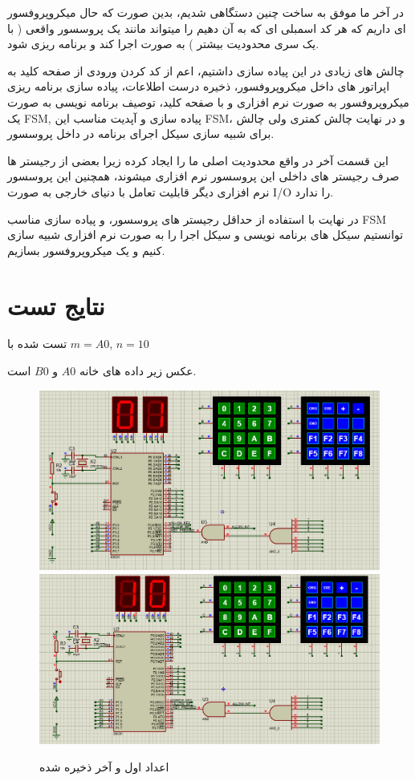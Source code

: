 \documentclass[11pt]{article}
\begin{document}
\begin{conclusion}
	در آخر ما موفق به ساخت چنین دستگاهی شدیم، بدین صورت که حال میکروپروفسور ای
	داریم که هر کد اسمبلی ای که به آن دهیم را میتواند مانند یک پروسسور واقعی ( با یک سری محدودیت بیشتر )
	به صورت  اجرا کند و برنامه ریزی شود.

	چالش های زیادی در این پیاده سازی داشتیم، اعم از
	کد کردن ورودی از صفحه کلید به اپراتور های داخل میکروپروفسور،
	ذخیره درست اطلاعات، پیاده سازی برنامه ریزی میکروپروفسور به صورت نرم افزاری و با صفحه کلید، توصیف
	برنامه نویسی به صورت یک FSM, پیاده سازی و آپدیت مناسب این FSM،
	و در نهایت چالش کمتری ولی چالش برای شبیه سازی سیکل اجرای برنامه در داخل پروسسور.

	این قسمت آخر در واقع محدودیت اصلی ما را ایجاد کرده زیرا بعضی از رجیستر ها
	صرف رجیستر های داخلی این پروسسور نرم افزاری میشوند، همچنین این پروسسور نرم افزاری
	دیگر قابلیت تعامل با دنیای خارجی به صورت I/O را ندارد.

	در نهایت با استفاده از حداقل رجیستر های پروسسور، و پیاده سازی مناسب FSM توانستیم
	سیکل های برنامه نویسی و سیکل اجرا را به صورت نرم افزاری شبیه سازی کنیم و یک
	میکروپروفسور بسازیم.
\end{conclusion}

\clearpage

\section{نتایج تست}

تست شده با $m=A0$, $n=10$

عکس زیر داده های خانه $A0$ و $B0$ است.
\begin{figure}[h]
	\centering
	\includegraphics*[width=0.45\linewidth]{result/firstnum.png}
	\includegraphics*[width=0.45\linewidth]{result/lastnum.png}
	\caption{اعداد اول و آخر ذخیره شده}
\end{figure}
\end{document}
